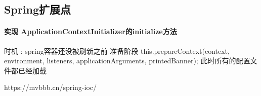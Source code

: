 \documentclass[../../../interview-questions.tex]{subfiles}
\begin{document}
\subsection{Spring扩展点}

\paragraph{实现 ApplicationContextInitializer的initialize方法}


时机 : spring容器还没被刷新之前 准备阶段 this.prepareContext(context, environment, listeners, applicationArguments, printedBanner); 此时所有的配置文件都已经加载


https://mvbbb.cn/spring-ioc/
\end{document}
